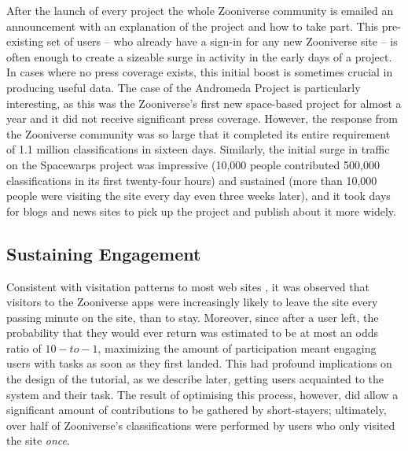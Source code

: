 \documentclass{sigchi}
\begin{document}
After the launch of every project the whole Zooniverse community is emailed an announcement with an explanation of the project and how to take part. This pre-existing set of users -- who already have a sign-in for any new Zooniverse site -- is often enough to create a sizeable surge in activity in the early days of a project. In cases where no press coverage exists, this initial boost is sometimes crucial in producing useful data. The case of the Andromeda Project is particularly interesting, as this was the Zooniverse's first new space-based project for almost a year and it did not receive significant press coverage. However, the response from the Zooniverse community was so large that it completed its entire requirement of 1.1 million classifications in sixteen days. Similarly, the initial surge in traffic on the Spacewarps project was impressive (10,000 people contributed 500,000 classifications in its first twenty-four hours) and sustained (more than 10,000 people were visiting the site every day even three weeks later), and it took days for blogs and news sites to pick up the project and publish about it more widely.


\subsection{Sustaining Engagement}

Consistent with visitation patterns to most web sites \cite{TODO}, it was observed that visitors to the Zooniverse apps were increasingly likely to leave the site every passing minute on the site, than to stay.  Moreover, since after a user left, the probability that they would ever return was estimated to be at most an odds ratio of $10-to-1$, maximizing the amount of participation meant engaging users with tasks as soon as they first landed.  This had profound implications on the design of the tutorial, as we describe later, getting users acquainted to the system and their task.  The result of optimising this process, however, did allow a significant amount of contributions to be gathered by short-stayers; ultimately, over half of Zooniverse's classifications were performed by users who only visited the site \emph{once}.

\end{document}
